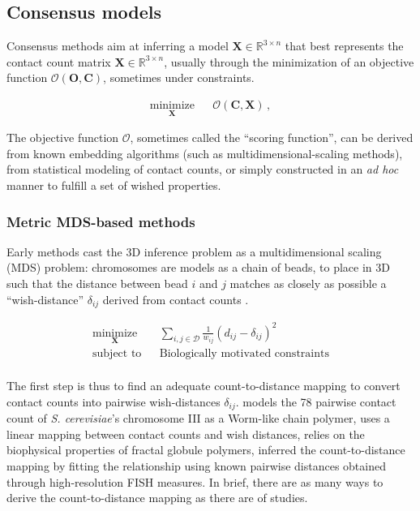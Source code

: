 \documentclass[2columns]{article}
\newcommand{\Xb}{\textbf{X}}
\newcommand{\RR}{\mathbb{R}}
\begin{document}
\subsection*{Consensus models}

Consensus methods aim at inferring a model $\mathbf{X} \in \RR^{3 \times n}$
that best represents the contact count matrix $\mathbf{X} \in \RR^{3 \times
n}$, usually through the minimization of an objective function
$\mathcal{O}(\mathbf{O}, \mathbf{C})$, sometimes under constraints.

\begin{equation*}
\renewcommand{\arraystretch}{2}
\begin{array}{ccl}
\underset{\Xb}{\text{minimize}} & & \mathcal{O}(\mathbf{C}, \Xb) \,,
\end{array}
\end{equation*}

The objective function $\mathcal{O}$, sometimes called the ``scoring
function'', can be derived from known embedding algorithms (such as
multidimensional-scaling methods), from statistical modeling of contact
counts, or simply constructed in an \textit{ad hoc} manner to fulfill a set of
wished properties.

\subsubsection*{Metric MDS-based methods}

Early methods cast the 3D inference problem as a
multidimensional scaling (MDS) problem: chromosomes are models as a chain of
beads, to place in 3D such that the distance between bead $i$ and $j$ matches
as closely as possible a ``wish-distance'' $\delta_{ij}$ derived from contact
counts \citep{dekker:capturing, duan:three-dimensional,
tanizawa:mapping, ay:three-dimensional} .

\begin{equation*}
\renewcommand{\arraystretch}{2}
\begin{array}{ccl}
\underset{\Xb}{\text{minimize}} & & \underset{i, j \in \mathcal{D}}{\sum}
\frac{1}{w_{ij}} (d_{ij} - \delta_{ij})^2 \\
\text{subject to} & & \text{Biologically motivated constraints} \\
\end{array}
\end{equation*}


The first step is thus to find an adequate count-to-distance mapping to
convert contact counts into pairwise wish-distances $\delta_{ij}$. 
\citet{dekker:capturing} models the 78 pairwise contact count of {\em S.
cerevisiae}'s chromosome III as a Worm-like chain polymer,
\citet{duan:three-dimensional} uses a linear mapping between contact counts
and wish distances, \citet{ay:three-dimensional} relies on the biophysical
properties of fractal globule polymers, \citet{tanizawa:mapping} inferred the
count-to-distance mapping by fitting the relationship using known pairwise
distances obtained through high-resolution FISH measures. In brief, there are
as many ways to derive the count-to-distance mapping as there are of studies.
\end{document}

